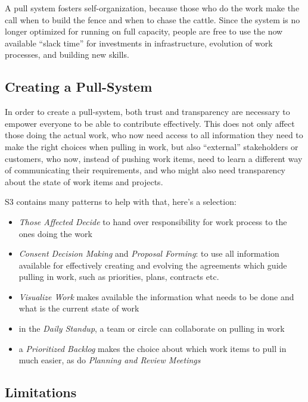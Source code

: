 A pull system fosters self-organization, because those who do the work make the call when to build the fence and when to chase the cattle. Since the system is no longer optimized for running on full capacity, people are free to use the now available ``slack time'' for investments in infrastructure, evolution of work processes, and building new skills.

\subsection{Creating a Pull-System}
\label{creatingapull-system}

In order to create a pull-system, both trust and transparency are necessary to empower everyone to be able to contribute effectively. This does not only affect those doing the actual work, who now need access to all information they need to make the right choices when pulling in work, but also ``external'' stakeholders or customers, who now, instead of pushing work items, need to learn a different way of communicating their requirements, and who might also need transparency about the state of work items and projects.

S3 contains many patterns to help with that, here's a selection:

\begin{itemize}
\item \emph{Those Affected Decide} to hand over responsibility for work process to the ones doing the work

\item \emph{Consent Decision Making} and \emph{Proposal Forming}: to use all information available for effectively creating and evolving the agreements which guide pulling in work, such as priorities, plans, contracts etc.

\item \emph{Visualize Work} makes available the information what needs to be done and what is the current state of work

\item in the \emph{Daily Standup}, a team or circle can collaborate on pulling in work

\item a \emph{Prioritized Backlog} makes the choice about which work items to pull in much easier, as do \emph{Planning and Review Meetings}

\end{itemize}

\subsection{Limitations}
\label{limitations}

